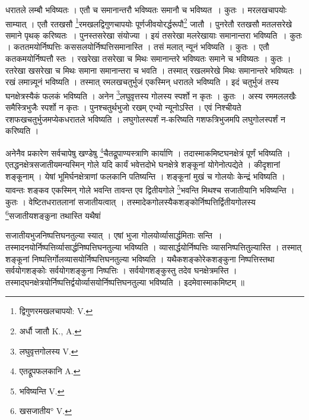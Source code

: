 \documentclass[11pt, openany]{book}
\begin{document}
\newpage
\noindent धरातले लम्बौ भविष्यतः । एतौ च समानान्तरौ भविष्यतः समानौ च भविष्यत~। कुतः । मरलखचापयोः साम्यात् । एतौ रतखसौ \renewcommand{\thefootnote}{१}\footnote{द्विगुणरमखलचापयो: {\en V.} }रमखलद्विगुणचापयोः पूर्णजीवयोरर्द्धरूपौ\renewcommand{\thefootnote}{२}\footnote{अर्धौ जातौ {\en K., A.}} जातौ । पुनरेतौ रतखसौ मतलसरेखे समाने पृथक् करिष्यतः~। पुनस्तसरेखा संयोज्या । इयं तसरेखा मलरेखायाः समानान्तरा भविष्यति~। कुतः । कततमयोर्निष्पत्तिः कससलयोर्निष्पत्तिसमानास्ति । तसं मलात् न्यूनं भविष्यति । कुतः । एतौ कतकमयोर्निष्पत्तौ स्तः । रखरेखा तसरेखा
च मिथः समानान्तरे भविष्यतः समाने च भविष्यतः । कुतः । रतरेखा खसरेखा च मिथः समाना समानान्तरा च भवति । तस्मात् रखलमरेखे मिथः समानान्तरे भविष्यतः । रखं लमान्न्यूनं भविष्यति । तस्मात् रमलखचतुर्भुजं एकस्मिन् धरातले भविष्यति । इदं चतुर्भुजं तस्य घनक्षेत्रस्यैकं फलकं भविष्यति । अनेन \renewcommand{\thefootnote}{३}\footnote{लघुवृत्तगोलस्य {\en V.}}लघुवृत्तस्य गोलस्य स्पर्शो न कृतः । कुतः~। अस्य रममललखैः समैस्त्रिभुजैः स्पर्शो न कृतः । पुनश्चतुर्थभुजो रखम् एभ्यो न्यूनोऽस्ति । एवं निश्चीयते रशफखचतुर्भुजमप्येकधरातले भविष्यति । लघुगोलस्पर्शं न-करिष्यति गशफत्रिभुजमपि लघुगोलस्पर्शं न करिष्यति । \\
\vspace{10mm}

 अनेनैव प्रकारेण सर्वचापेषु खण्डेषु \renewcommand{\thefootnote}{४}\footnote{एतद्रूपफलकानि {\en A.}}चैतद्रूपाण्यस्त्राणि कार्याणि
 । तदास्माकमिष्टघनक्षेत्रं पूर्णं भविष्यति । एतद्धनक्षेत्रसजातीयमन्यस्मिन् गोले यदि कार्यं भवेत्तदोभे घनक्षेत्रे शङ्कूनां योगेनोत्पद्येते । कीदृशानां शङ्कूनाम् । येषां भूमिर्घनक्षेत्राणां फलकानि पतिष्यन्ति । शङ्कूनां मुखं च गोलयोः केन्द्रं भविष्यति । यावन्तः शङ्कव एकस्मिन् गोले भवन्ति तावन्त एव द्वितीयगोले \renewcommand{\thefootnote}{५}\footnote{भविष्यन्ति {\en V.}}भवन्ति मिथश्च सजातीयानि भविष्यन्ति । कुतः । वेष्टितधरातलानां सजातीयत्वात् । तस्मादेकगोलस्यैकशङ्कोर्निष्पत्तिर्द्वितीयगोलस्य \renewcommand{\thefootnote}{६}\footnote{खसजातीय° {\en V.}}सजातीयशङ्कुना तथास्ति यथैषां 

\newpage
\noindent सजातीयभुजनिष्पत्तिघनतुल्या स्यात् । एषां भुजा गोलयोर्व्यासार्द्धमिताः सन्ति~। तस्मादनयोर्निष्पत्तिर्व्यासार्द्धनिष्पत्तिघनतुल्या भविष्यति । व्यासार्द्धयोर्निष्पत्तिः व्यासनिष्पत्तितुल्यास्ति । तस्मात् शङ्कूनां निष्पत्तिर्गोलव्यासयोर्निष्पत्तिघनतुल्या भविष्यति । यथैकशङ्कोरेकशङ्कुना निष्पत्तिस्तथा सर्वयोगशङ्कोः सर्वयोगशङ्कुना निष्पत्तिः । सर्वयोगशङ्कुस्तु तदेव घनक्षेत्रमस्ति । तस्माद्घनक्षेत्रयोर्निष्पत्तिर्द्वयोर्व्यासयोर्निष्पत्तिघनतुल्या भविष्यति । इदमेवास्माकमिष्टम् ॥ \\
\end{document}
